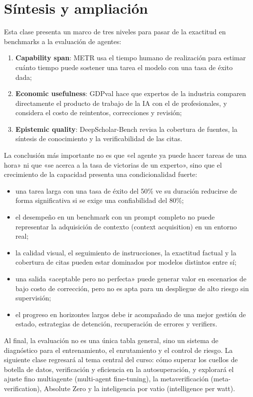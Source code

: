 \section{Síntesis y ampliación}

Esta clase presenta un marco de tres niveles para pasar de la exactitud en benchmarks a la evaluación de agentes:

\begin{enumerate}
    \item \textbf{Capability span}: METR usa el tiempo humano de realización para estimar cuánto tiempo puede sostener una tarea el modelo con una tasa de éxito dada;
    \item \textbf{Economic usefulness}: GDPval hace que expertos de la industria comparen directamente el producto de trabajo de la IA con el de profesionales, y considera el costo de reintentos, correcciones y revisión;
    \item \textbf{Epistemic quality}: DeepScholar-Bench revisa la cobertura de fuentes, la síntesis de conocimiento y la verificabilidad de las citas.
\end{enumerate}

La conclusión más importante no es que «el agente ya puede hacer tareas de una hora» ni que «se acerca a la tasa de victorias de un experto», sino que el crecimiento de la capacidad presenta una condicionalidad fuerte:

\begin{itemize}
    \item una tarea larga con una tasa de éxito del 50\% ve su duración reducirse de forma significativa si se exige una confiabilidad del 80\%;
    \item el desempeño en un benchmark con un prompt completo no puede representar la adquisición de contexto (context acquisition) en un entorno real;
    \item la calidad visual, el seguimiento de instrucciones, la exactitud factual y la cobertura de citas pueden estar dominados por modelos distintos entre sí;
    \item una salida «aceptable pero no perfecta» puede generar valor en escenarios de bajo costo de corrección, pero no es apta para un despliegue de alto riesgo sin supervisión;
    \item el progreso en horizontes largos debe ir acompañado de una mejor gestión de estado, estrategias de detención, recuperación de errores y verifiers.
\end{itemize}

Al final, la evaluación no es una única tabla general, sino un sistema de diagnóstico para el entrenamiento, el enrutamiento y el control de riesgo. La siguiente clase regresará al tema central del curso: cómo superar los cuellos de botella de datos, verificación y eficiencia en la autosuperación, y explorará el ajuste fino multiagente (multi-agent fine-tuning), la metaverificación (meta-verification), Absolute Zero y la inteligencia por vatio (intelligence per watt).


